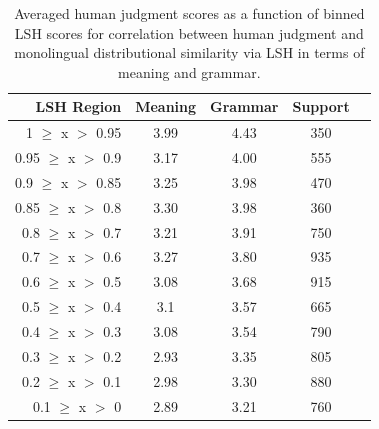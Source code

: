 \documentclass[11pt]{article}
\begin{document}
\begin{table}%
\begin{center}
\begin{tabular}{rcccc}%
\hline \hline
\bf \scriptsize LSH Region & \bf \scriptsize Meaning & \bf \scriptsize Grammar & \bf \scriptsize Support \\ \hline
{\scriptsize 1 $\geq$ x $>$ 0.95} & {\scriptsize 3.99} & {\scriptsize 4.43} & {\scriptsize 350}  \\
{\scriptsize 0.95 $\geq$ x $>$ 0.9} & {\scriptsize 3.17} & {\scriptsize 4.00} & {\scriptsize 555}  \\
{\scriptsize 0.9 $\geq$ x $>$ 0.85} & {\scriptsize 3.25} & {\scriptsize 3.98} & {\scriptsize 470}  \\
{\scriptsize 0.85 $\geq$ x $>$ 0.8} & {\scriptsize 3.30} & {\scriptsize 3.98} & {\scriptsize 360}  \\
{\scriptsize 0.8 $\geq$ x $>$ 0.7} & {\scriptsize 3.21} & {\scriptsize 3.91} & {\scriptsize 750}  \\
{\scriptsize 0.7 $\geq$ x $>$ 0.6} & {\scriptsize 3.27} & {\scriptsize 3.80} & {\scriptsize 935}  \\
{\scriptsize 0.6 $\geq$ x $>$ 0.5} & {\scriptsize 3.08} & {\scriptsize 3.68} & {\scriptsize 915}  \\
{\scriptsize 0.5 $\geq$ x $>$ 0.4} & {\scriptsize 3.1 } & {\scriptsize 3.57} & {\scriptsize 665}  \\
{\scriptsize 0.4 $\geq$ x $>$ 0.3} & {\scriptsize 3.08} & {\scriptsize 3.54} & {\scriptsize 790}  \\
{\scriptsize 0.3 $\geq$ x $>$ 0.2} & {\scriptsize 2.93} & {\scriptsize 3.35} & {\scriptsize 805}  \\
{\scriptsize 0.2 $\geq$ x $>$ 0.1} & {\scriptsize 2.98} & {\scriptsize 3.30} & {\scriptsize 880}  \\
{\scriptsize 0.1 $\geq$ x $>$ 0} & {\scriptsize 2.89} & {\scriptsize 3.21} & {\scriptsize 760}  \\
\hline
\end{tabular}
\end{center}
\caption{Averaged human judgment scores as a function of binned LSH scores for correlation between human judgment and monolingual distributional similarity via LSH in terms of meaning and grammar.}
\label{table9}
\end{table}
\end{document}
